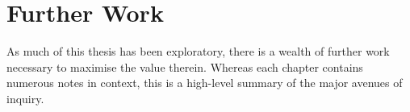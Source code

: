 \section{Further Work}
As much of this thesis has been exploratory, there is a wealth of further work necessary to maximise the value therein.  Whereas each chapter contains numerous notes in context, this is a high-level summary of the major avenues of inquiry.








